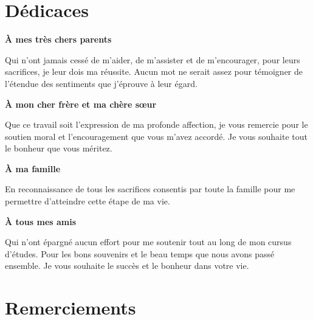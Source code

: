 
\chapter*{Dédicaces}

\begin{center}

{\Large\textbf{À mes très chers parents}}

\vspace{1em}
 
Qui n'ont jamais cessé de m'aider, de m'assister et de m'encourager, pour leurs sacrifices, je leur dois ma réussite. Aucun mot ne serait assez pour témoigner de l'étendue des sentiments que j'éprouve à leur égard. 

\vspace{2em}
{\large\textbf{À mon cher frère et ma chère sœur}}

\vspace{1em}

Que ce travail soit l'expression de ma profonde affection, je vous remercie pour le soutien moral et l'encouragement que vous m'avez accordé. Je vous souhaite tout le bonheur que vous méritez. 

\vspace{2em}
{\large\textbf{À ma famille}}

\vspace{1em}

En reconnaissance de tous les sacrifices consentis par toute la famille pour me permettre d'atteindre cette étape de ma vie. 

\vspace{2em}

{\large\textbf{À tous mes amis}}

\vspace{1em}

Qui n'ont épargné aucun effort pour me soutenir tout au long de mon cursus d'études. Pour les bons souvenirs et le beau temps que nous avons passé ensemble. Je vous souhaite le succès et le bonheur dans votre vie. 

\end{center}

\newpage
{}
\chapter*{Remerciements}


